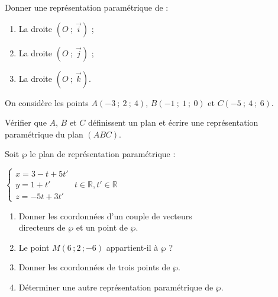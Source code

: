 \documentclass{cornouaille}
\begin{document}
\begin{colonne*exercice}
\begin{exercice}
  Donner une représentation paramétrique de :
  \begin{enumerate}
  \item La droite $(O\ ;\ \overrightarrow{i})$ ;
  \item La droite $(O\ ;\ \overrightarrow{j})$ ;
  \item La droite $(O\ ;\ \overrightarrow{k})$.
  \end{enumerate}
\end{exercice}

\begin{exercice}
  On considère les points $A(-3\ ;\ 2\ ;\ 4)$, $B(-1\ ;\ 1\ ;\ 0)$ et
  $C(-5\ ;\ 4\ ;\ 6)$.

  Vérifier que $A$, $B$ et $C$ définissent un plan et écrire une
  représentation paramétrique du plan $(ABC)$.
\end{exercice}



\begin{exercice}\label{ex54G2}
  Soit $\wp$ le plan de représentation paramétrique :

  \begin{center}
    $\begin{cases}x=3-t+5t' \\y=1+t' \\z=-5t+3t' \end{cases}$
    $t\in\mathbb{R}, t'\in\mathbb{R}$
  \end{center}

  \begin{enumerate}
  \item Donner les coordonnées d'un couple de vecteurs\\ directeurs de
    $\wp$ et un point de $\wp$.
  \item Le point $M(6\,;2\,;-6)$ appartient-il à $\wp$ ?
  \item Donner les coordonnées de trois points de $\wp$.
  \item Déterminer une autre représentation paramétrique de $\wp$.
  \end{enumerate}
\end{exercice}


\end{colonne*exercice}
\end{document}
